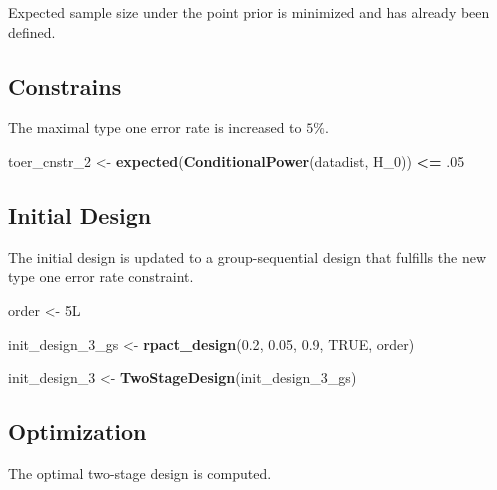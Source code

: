 \documentclass[]{book}
\newenvironment{Shaded}{\begin{snugshade}}{\end{snugshade}}
\newcommand{\DecValTok}[1]{\textcolor[rgb]{0.00,0.00,0.81}{#1}}
\newcommand{\FloatTok}[1]{\textcolor[rgb]{0.00,0.00,0.81}{#1}}
\newcommand{\KeywordTok}[1]{\textcolor[rgb]{0.13,0.29,0.53}{\textbf{#1}}}
\newcommand{\NormalTok}[1]{#1}
\newcommand{\OperatorTok}[1]{\textcolor[rgb]{0.81,0.36,0.00}{\textbf{#1}}}
\newcommand{\OtherTok}[1]{\textcolor[rgb]{0.56,0.35,0.01}{#1}}
\newcommand{\StringTok}[1]{\textcolor[rgb]{0.31,0.60,0.02}{#1}}
\begin{document}
Expected sample size under the point prior is minimized and has already been
defined.

\hypertarget{constrains-9}{%
\subsection{Constrains}\label{constrains-9}}

The maximal type one error rate is increased to \(5\%\).

\begin{Shaded}
\begin{Highlighting}[]
\NormalTok{toer_cnstr_}\DecValTok{2}\NormalTok{ <-}\StringTok{ }\KeywordTok{expected}\NormalTok{(}\KeywordTok{ConditionalPower}\NormalTok{(datadist, H_}\DecValTok{0}\NormalTok{)) }\OperatorTok{<=}\StringTok{ }\FloatTok{.05}
\end{Highlighting}
\end{Shaded}

\hypertarget{initial-design-8}{%
\subsection{Initial Design}\label{initial-design-8}}

The initial design is updated to a group-sequential design that fulfills
the new type one error rate constraint.

\begin{Shaded}
\begin{Highlighting}[]
\NormalTok{order <-}\StringTok{ }\NormalTok{5L }

\NormalTok{init_design_}\DecValTok{3}\NormalTok{_gs <-}\StringTok{ }\KeywordTok{rpact_design}\NormalTok{(}\FloatTok{0.2}\NormalTok{, }\FloatTok{0.05}\NormalTok{, }\FloatTok{0.9}\NormalTok{, }\OtherTok{TRUE}\NormalTok{, order)}

\NormalTok{init_design_}\DecValTok{3}\NormalTok{    <-}\StringTok{ }\KeywordTok{TwoStageDesign}\NormalTok{(init_design_}\DecValTok{3}\NormalTok{_gs)}
\end{Highlighting}
\end{Shaded}

\hypertarget{optimization-8}{%
\subsection{Optimization}\label{optimization-8}}

The optimal two-stage design is computed.
\end{document}
